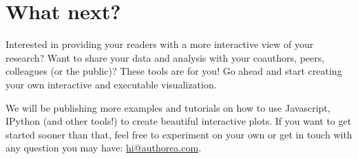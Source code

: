 \section{What next?}

Interested in providing your readers with a more interactive view of your research? Want to share your data and analysis with your coauthors, peers, colleagues (or the public)? These tools are for you! Go ahead and start creating your own interactive and executable visualization.

We will be publishing more examples and tutorials on how to use Javascript, IPython (and other tools!) to create beautiful interactive plots. If you want to get started sooner than that, feel free to experiment on your own or get in touch with any question you may have: \href{mailto:hi@authorea.com}{hi@authorea.com}. 